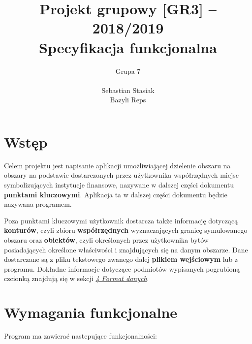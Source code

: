 \documentclass[a4paper, 10pt, titlepage]{article}
\title {Projekt grupowy [GR3] -- 2018/2019\\Specyfikacja funkcjonalna}
\author{Grupa 7 \\\\ Sebastian Stasiak \\ Bazyli Reps}
\begin{document}
\maketitle
\tableofcontents
\newpage

\section{Wstęp}
Celem projektu jest napisanie aplikacji umożliwiającej dzielenie obszaru na obszary na podstawie dostarczonych przez użytkownika współrzędnych miejsc symbolizujących instytucje finansowe, nazywane w dalszej części dokumentu \textbf{punktami kluczowymi}.
Aplikacja ta w dalszej części dokumentu będzie nazywana programem.

Poza punktami kluczowymi użytkownik dostarcza także informację dotyczącą \textbf{konturów}, czyli zbioru \textbf{współrzędnych} wyznaczających granicę symulowanego obszaru oraz \textbf{obiektów}, czyli określonych przez użytkownika bytów posiadających określone właściwości i znajdujących się na danym obszarze.
Dane dostarczane są z pliku tekstowego zwanego dalej \textbf{plikiem wejściowym} lub z programu.
Dokładne informacje dotyczące podmiotów wypisanych pogrubioną czcionką znajdują się w sekcji \hyperref[sec:daneWej]{\textit{4 Format danych}}.

\section{Wymagania funkcjonalne}
Program ma zawierać nastepujące funkcjonalności:
\end{document}
